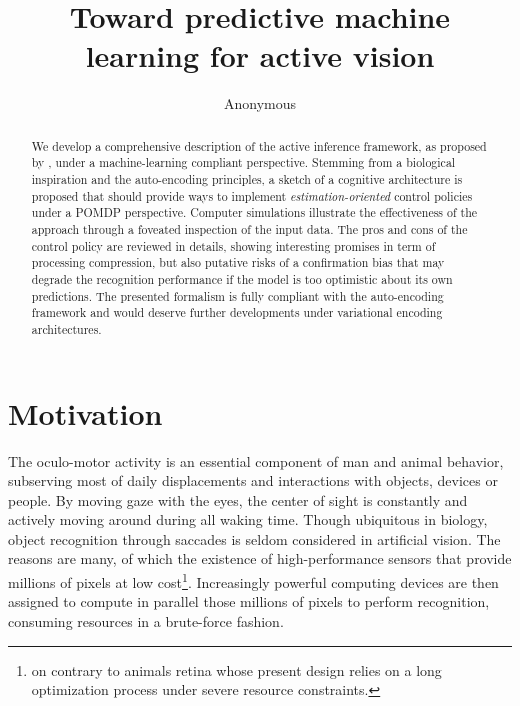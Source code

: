 \documentclass{article} %
\title{Toward predictive machine learning for active vision}
\author{Anonymous
}
\begin{document}
\maketitle

\begin{abstract}
We develop a comprehensive description of the active inference framework, as proposed by \cite{friston2010free}, under a machine-learning compliant perspective. Stemming from a biological inspiration and the auto-encoding principles, a sketch of a cognitive architecture is proposed that should provide ways to implement \emph{estimation-oriented} control policies under a POMDP perspective. 
Computer simulations illustrate the effectiveness of the approach through a foveated inspection of the input data.
The pros and cons of the control policy are reviewed in details, showing interesting promises in term of processing compression, but also putative risks of a confirmation bias that may degrade the recognition performance if the model is too optimistic about its own predictions. The presented formalism is fully compliant with the auto-encoding framework and would deserve further developments under variational encoding architectures.
\end{abstract}

\section{Motivation}

	The oculo-motor activity is an essential component of man and animal behavior, subserving most of daily displacements and interactions with objects, devices or people. By moving gaze with the eyes, the center of sight is constantly and actively moving around during all waking time.  %
	Though ubiquitous in biology, object recognition through saccades is seldom considered in artificial vision. The reasons are many, of which the existence of high-performance sensors that provide millions of pixels at low cost\footnote{on contrary to animals retina whose present design relies on a long optimization process under severe resource constraints.}. Increasingly powerful computing devices are then assigned to compute in parallel those millions of pixels to perform recognition, consuming resources in a brute-force fashion. 
	
\end{document}
